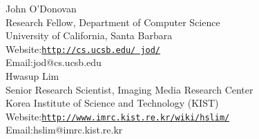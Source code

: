\documentclass[10pt]{article}
\newcommand{\halfblankline}{\quad\vspace{-0.5\baselineskip}\pagebreak[3]}
\providecommand*\url[1]{\href{#1}{#1}}
\renewcommand*\url[1]{\href{#1}{\texttt{#1}}}
\begin{document}
John O'Donovan\\
Research Fellow, Department of Computer Science\\
University of California, Santa Barbara\\
Website:\url{http://cs.ucsb.edu/~jod/}\\
Email:{jod@cs.ucsb.edu}\\

Hwasup Lim\\
Senior Research Scientist, Imaging Media Research Center\\
Korea Institute of Science and Technology (KIST)\\
Website:\url{http://www.imrc.kist.re.kr/wiki/hslim/}\\
Email:{hslim@imrc.kist.re.kr}%


\end{document}
